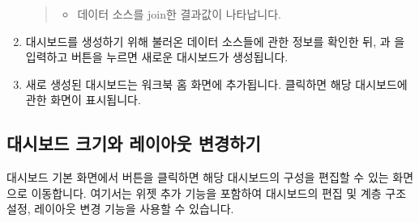 \documentclass[letterpaper,10pt,english]{sphinxmanual}
\begin{document}
\begin{enumerate}
\begin{quote}
\begin{itemize}
\item {} 
 데이터 소스를 join한 결과값이 나타납니다.

\end{itemize}
\end{quote}

\item {} 
대시보드를 생성하기 위해 불러온 데이터 소스들에 관한 정보를 확인한 뒤, 과 을 입력하고  버튼을 누르면 새로운 대시보드가 생성됩니다.
\begin{quote}

\begin{figure}[H]
\centering

\noindent{}
\end{figure}
\end{quote}

\item {} 
새로 생성된 대시보드는 워크북 홈 화면에 추가됩니다. 클릭하면 해당 대시보드에 관한 화면이 표시됩니다.
\begin{quote}

\begin{figure}[H]
\centering

\noindent{}
\end{figure}
\end{quote}

\end{enumerate}


\subsection{대시보드 크기와 레이아웃 변경하기}
\label{\detokenize{discovery/part04/change_dashboard_layout_and_size:id1}}\label{\detokenize{discovery/part04/change_dashboard_layout_and_size::doc}}
대시보드 기본 화면에서  버튼을 클릭하면 해당 대시보드의 구성을 편집할 수 있는 화면으로 이동합니다. 여기서는 위젯 추가 기능을 포함하여 대시보드의 편집 및 계층 구조 설정, 레이아웃 변경 기능을 사용할 수 있습니다.
\end{document}
